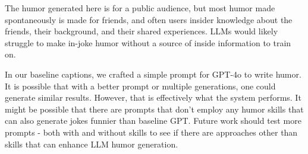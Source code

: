 The humor generated here is for a public audience, but most humor made spontaneously is made for friends, and often users insider knowledge about the friends, their background, and their shared experiences. LLMs would likely struggle to make in-joke humor without a source of inside information to train on.

In our baseline captions, we crafted a simple prompt for GPT-4o to write humor. It is possible that with a better prompt or multiple generations, one could generate similar results. However, that is effectively what the system performs. It might be possible that there are prompts that don't employ any humor skills that can also generate jokes funnier than baseline GPT. Future work should test more prompts - both with and without skills to see if there are approaches other than skills that can enhance LLM humor generation.







